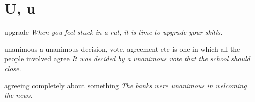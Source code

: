 \section{U, u}

\begin{DefWord}{upgrade}
    \textit{When you feel stuck in a rut, it is time to upgrade your skills.}
\end{DefWord}

\begin{DefWord}{unanimous}
    a unanimous decision, vote, agreement etc is one in which all the people involved agree
    \textit{It was decided by a unanimous vote that the school should close.}

    agreeing completely about something
    \textit{The banks were unanimous in welcoming the news.}
\end{DefWord}

